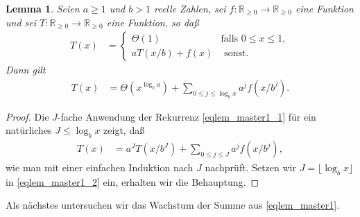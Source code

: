\documentclass[10pt,reqno]{amsart}
\numberwithin{equation}{section}
\newcommand\RRpos{\mathbb R_{\geq0}}
\newtheorem{lemma}[definition]{Lemma}
\begin{document}
\begin{lemma}\label{lem_master1}
	Seien $a\geq1$ und $b>1$ reelle Zahlen, sei $f:\RRpos\to\RRpos$ eine Funktion und sei $T:\RRpos\to\RRpos$ eine Funktion, so da\ss
	\begin{align}\label{eqlem_master1_1}
		T(x)&=\begin{cases}\Theta(1)&\mbox{falls }0\leq x\leq 1,\\ aT(x/b)+f(x)&\mbox{ sonst.}\end{cases}
	\end{align}
	Dann gilt
	\begin{align}\label{eqlem_master1}
		T(x)&=\Theta(x^{\log_ba})+\sum_{0\leq j\leq\log_bx}a^jf(x/b^j).
	\end{align}
\end{lemma}
\begin{proof}
	Die $J$-fache Anwendung der Rekurrenz \eqref{eqlem_master1_1} f\"ur ein nat\"urliches $J\leq\log_bx$ zeigt, da\ss
	\begin{align}\label{eqlem_master1_2}
		T(x)&=a^J T(x/b^J)+\sum_{0\leq j\leq J}a^jf(x/b^j),
	\end{align}
	wie man mit einer einfachen Induktion nach $J$ nachpr\"uft.	
	Setzen wir $J=\lfloor\log_bx\rfloor$ in \eqref{eqlem_master1_2} ein, erhalten wir die Behauptung.
\end{proof}

Als n\"achstes untersuchen wir das Wachstum der Summe aus \eqref{eqlem_master1}.
\end{document}
